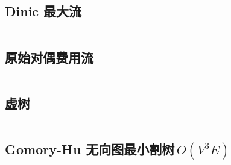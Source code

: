 \documentclass[titlepage, a4paper]{article}
\begin{document}
\begin{multicols}{2}
\begin{spacing}{0.6}
				\subsection{Dinic 最大流}
					
					\inputminted[highlightlines={8,30}]{cpp}{src/TreeandGraph/Dinic.cpp}
				\subsection{原始对偶费用流}
					\inputminted[highlightlines={2,3,22,25,28,31,42,43}]{cpp}{src/TreeandGraph/多路增广费用流.cpp}
				\subsection{虚树}
				\inputminted{cpp}{src/TreeandGraph/虚树.cpp}
				
				\subsection{Gomory-Hu 无向图最小割树\,$O(V ^ 3 E)$}
					

\end{spacing}
\end{multicols}
\end{document}

